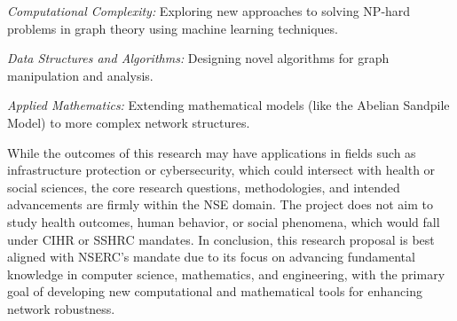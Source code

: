 \begin{justification-for-eligibility-of-proposed-research}
\textit{Computational Complexity:} Exploring new approaches to solving NP-hard problems in graph theory using machine learning techniques.

\textit{Data Structures and Algorithms:} Designing novel algorithms for graph manipulation and analysis.

\textit{Applied Mathematics:} Extending mathematical models (like the Abelian Sandpile Model) to more complex network structures.

While the outcomes of this research may have applications in fields such as infrastructure protection or cybersecurity, which could intersect with health or social sciences, the core research questions, methodologies, and intended advancements are firmly within the NSE domain. The project does not aim to study health outcomes, human behavior, or social phenomena, which would fall under CIHR or SSHRC mandates. In conclusion, this research proposal is best aligned with NSERC's mandate due to its focus on advancing fundamental knowledge in computer science, mathematics, and engineering, with the primary goal of developing new computational and mathematical tools for enhancing network robustness.
\end{justification-for-eligibility-of-proposed-research}
